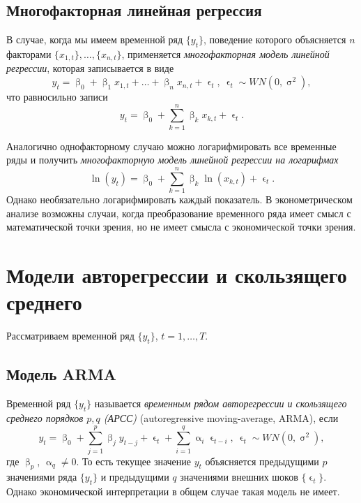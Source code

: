 \documentclass[a4paper, 14pt]{extreport}
\numberwithin{equation}{section}
\renewcommand{\alpha}{\upalpha}
\renewcommand{\beta}{\upbeta}
\renewcommand{\epsilon}{\upvarepsilon}
\renewcommand{\sigma}{\upsigma}
\numberwithin{equation}{section}
\begin{document}
	\subsection{Многофакторная линейная регрессия}
	
	В случае, когда мы имеем временной ряд $\{y_t\}$, поведение которого объясняется $n$ факторами $\{x_{1,t}\},\ldots, \{x_{n,t}\}$, применяется \textit{многофакторная модель линейной регрессии}, которая записывается в виде
	\begin{equation}\label{eq-mult-lin-reg}
		y_t = \beta_0 + \beta_1 x_{1,t} + \ldots + \beta_n x_{n,t} + \epsilon_t,\ \epsilon_t\sim WN(0,\sigma^2),
	\end{equation}
	что равносильно записи
	\begin{equation}
		y_t  = \beta_0 + \sum_{k=1}^{n}\beta_k x_{k,t} + \epsilon_t.
	\end{equation}
	
	Аналогично однофакторному случаю можно логарифмировать все временные ряды и получить \textit{многофакторную модель линейной регрессии на логарифмах}
	\begin{equation}
		\ln(y_t)  = \beta_0 + \sum_{k=1}^{n}\beta_k \ln(x_{k,t}) + \epsilon_t.
	\end{equation}
	Однако необязательно логарифмировать каждый показатель. В эконометрическом анализе возможны случаи, когда преобразование временного ряда имеет смысл с математической точки зрения, но не имеет смысла с экономической точки зрения.
	
	\section{Модели авторегрессии и скользящего среднего}
	
	Рассматриваем временной ряд $\{y_t\}$, $t =1,\ldots, T$.
	\subsection{Модель ARMA}
	Временной ряд $\{y_t\}$ называется \textit{временным рядом авторегрессии и скользящего среднего порядков $p,q$ (АРСС)} (autoregressive moving-average, ARMA), если
	\begin{equation}\label{eq-arma}
		y_t = \beta_0 + \sum_{j=1}^{p} \beta_j y_{t-j} + \epsilon_t + \sum_{i=1}^q \alpha_i \epsilon_{t-i},\ \epsilon_t\sim WN(0,\sigma^2),
	\end{equation}
	где $\beta_p$, $\alpha_q \ne 0$. То есть текущее значение $y_t$ объясняется предыдущими $p$ значениями ряда $\{y_t\}$ и предыдущими $q$ значениями внешних шоков $\{\epsilon_t\}$. Однако экономической интерпретации в общем случае такая модель не имеет.
	
\end{document}
